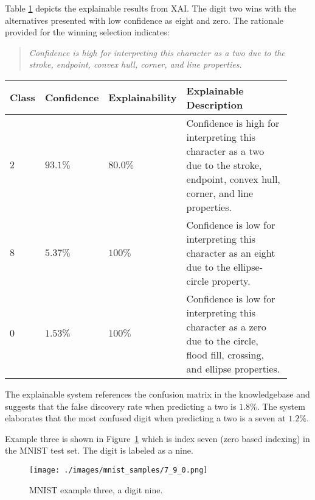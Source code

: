 Table \ref{table:mnist_example2_explanation} depicts the explainable results
from XAI. The digit two wins with the alternatives presented with low confidence
as eight and zero.  The rationale provided for the winning selection indicates:

\begin{quote}
    \textit{Confidence is high for interpreting this character as a two due to the stroke, endpoint, convex hull, corner, and line properties.}
\end{quote}

\begin{table}[H]
    \renewcommand{\arraystretch}{1.3}
     \label{table:mnist_example2_explanation}
    \begin{center}
    \begin{tabular}{| m{0.06\linewidth} | m{0.14\linewidth} | m{0.17\linewidth} | m{0.55\linewidth} |}
    \hline
     Class & Confidence & Explainability & Explainable Description \\
    \hline \hline
    $2$ & $93.1\%$ & $80.0\%$ & Confidence is high for interpreting this character as a two due to the stroke, endpoint, convex hull, corner, and line properties. \\ 
    \hline
    $8$ & $5.37\%$ & $100\%$ & Confidence is low for interpreting this character as an eight due to the ellipse-circle property. \\
    \hline
    $0$ & $1.53\%$ & $100\%$ & Confidence is low for interpreting this character as a zero due to the circle, flood fill, crossing, and ellipse properties. \\
    \hline
    \end{tabular}
    \end{center}
\end{table}

The explainable system references the confusion matrix in the knowledgebase and
suggests that the false discovery rate when predicting a two is $1.8\%$. The
system elaborates that the most confused digit when predicting a two is a seven
at $1.2\%$.

Example three is shown in Figure~\ref{fig:mnist_example3} which is index seven (zero
based indexing) in the MNIST test set. The digit is labeled as a nine.

\begin{figure}[H]
    \centerline{\texttt{[image: ./images/mnist\_samples/7\_9\_0.png]}}
    \caption{MNIST example three, a digit nine.}
    \label{fig:mnist_example3}
\end{figure}

